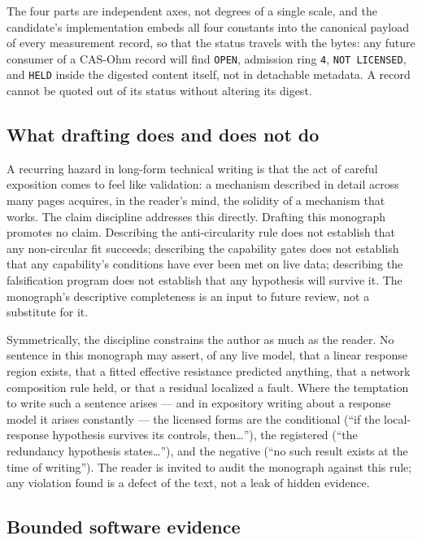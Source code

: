 The four parts are independent axes, not degrees of a single scale, and the candidate's implementation embeds all four constants into the canonical payload of every measurement record, so that the status travels with the bytes: any future consumer of a CAS-Ohm record will find \texttt{OPEN}, admission ring \texttt{4}, \texttt{NOT LICENSED}, and \texttt{HELD} inside the digested content itself, not in detachable metadata. A record cannot be quoted out of its status without altering its digest.

\subsection{What drafting does and does not do}\label{ch01:status:drafting}

A recurring hazard in long-form technical writing is that the act of careful exposition comes to feel like validation: a mechanism described in detail across many pages acquires, in the reader's mind, the solidity of a mechanism that works. The claim discipline addresses this directly. Drafting this monograph promotes no claim. Describing the anti-circularity rule does not establish that any non-circular fit succeeds; describing the capability gates does not establish that any capability's conditions have ever been met on live data; describing the falsification program does not establish that any hypothesis will survive it. The monograph's descriptive completeness is an input to future review, not a substitute for it.

Symmetrically, the discipline constrains the author as much as the reader. No sentence in this monograph may assert, of any live model, that a linear response region exists, that a fitted effective resistance predicted anything, that a network composition rule held, or that a residual localized a fault. Where the temptation to write such a sentence arises --- and in expository writing about a response model it arises constantly --- the licensed forms are the conditional (``if the local-response hypothesis survives its controls, then\ldots''), the registered (``the redundancy hypothesis states\ldots''), and the negative (``no such result exists at the time of writing''). The reader is invited to audit the monograph against this rule; any violation found is a defect of the text, not a leak of hidden evidence.

\subsection{Bounded software evidence}\label{ch01:status:software}

